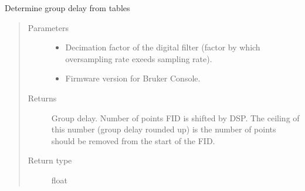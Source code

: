 \documentclass[letterpaper,10pt,english]{sphinxmanual}
\begin{document}
\begin{fulllineitems}
\label{\detokenize{dnpImport:dnpLab.dnpImport.topspin.find_group_delay}}
Determine group delay from tables
\begin{quote}\begin{description}
\item[{Parameters}] \leavevmode\begin{itemize}
\item {} 
 \sphinxhyphen{}\sphinxhyphen{} Decimation factor of the digital filter (factor by which oversampling rate exeeds sampling rate).

\item {} 
 \sphinxhyphen{}\sphinxhyphen{} Firmware version for Bruker Console.

\end{itemize}

\item[{Returns}] \leavevmode
Group delay. Number of points FID is shifted by DSP. The ceiling of this number (group delay rounded up) is the number of points should be removed from the start of the FID.

\item[{Return type}] \leavevmode
float

\end{description}\end{quote}

\end{fulllineitems}

\end{document}
